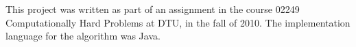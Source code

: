 
This project was written as part of an assignment in the
course 02249 Computationally Hard Problems at DTU, in the fall
of 2010. The implementation language for the algorithm was Java.


